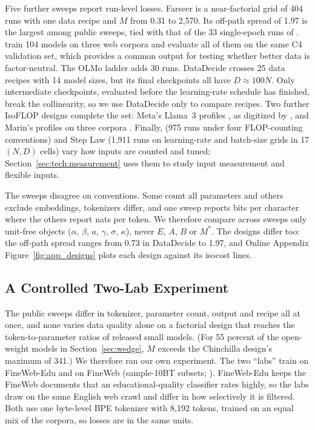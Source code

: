 Five further sweeps report run-level losses. Farseer \citep{li2025predictableb} is a near-factorial grid of 404 runs
with one data recipe and $M$ from 0.31 to 2,570. Its off-path spread of 1.97 is the largest among public sweeps, tied
with that of the 33 single-epoch runs of \citet{muennighoff2023scaling}. \citet{gadre2024language} train 104 models on
three web corpora and evaluate all of them on the same C4 validation set, which provides a common output for testing
whether better data is factor-neutral. The OLMo ladder \citep{bhagia2024establishing} adds 30 runs. DataDecide
\citep{magnusson2025datadecide} crosses 25 data recipes with 14 model sizes, but its final checkpoints all have
$D\approx100N$. Only intermediate checkpoints, evaluated before the learning-rate schedule has finished, break the
collinearity, so we use DataDecide only to compare recipes. Two further IsoFLOP designs complete the set: Meta's Llama~3
profiles \citep{grattafiori2024llama}, as digitized by \citet{czech2026llama3isoflop}, and Marin's profiles on three
corpora \citep{marin2026ladders}. Finally, \citet{porian2024resolving} (975 runs under four FLOP-counting conventions)
and Step Law \citep{li2025predictablea} (1,911 runs on learning-rate and batch-size grids in 17 $(N,D)$ cells) vary
how inputs are counted and tuned; Section~\ref{sec:tech:measurement} uses them to study input measurement and flexible
inputs.

The sweeps disagree on conventions. Some count all parameters and others exclude embeddings, tokenizers differ, and one
sweep reports bits per character where the others report nats per token. We therefore compare across sweeps only
unit-free objects ($\alpha$, $\beta$, $a$, $\gamma$, $\sigma$, $\kappa$), never $E$, $A$, $B$ or $M^{*}$. The designs
differ too: the off-path spread ranges from 0.73 in DataDecide to 1.97, and Online Appendix
Figure~\ref{fig:app_designs} plots each design against its isocost lines.

\subsection{A Controlled Two-Lab Experiment}

The public sweeps differ in tokenizer, parameter count, output and recipe all at once, and none varies data quality
alone on a factorial design that reaches the token-to-parameter ratios of released small models. (For 55 percent of
the open-weight models in Section~\ref{sec:wedge}, $M$ exceeds the Chinchilla design's maximum of 341.) We therefore
ran our own experiment. The two ``labs'' train on FineWeb-Edu and on FineWeb (sample-10BT subsets;
\citealp{penedo2024fineweb}). FineWeb-Edu keeps the FineWeb documents that an educational-quality classifier rates
highly, so the labs draw on the same English web crawl and differ in how selectively it is filtered. Both use one
byte-level BPE tokenizer with 8,192 tokens, trained on an equal mix of the corpora, so losses are in the same units.

